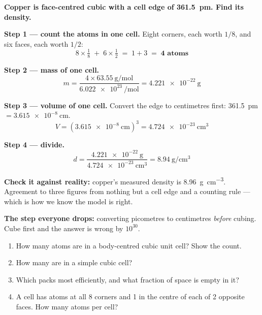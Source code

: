 \documentclass{apchem-worksheet}
\begin{document}
\begin{workedexample}
\textbf{Copper is face-centred cubic with a cell edge of
\SI{361.5}{\pico\metre}. Find its density.}

\textbf{Step 1 --- count the atoms in one cell.} Eight corners, each
worth $1/8$, and six faces, each worth $1/2$:
\[ 8 \times \tfrac{1}{8} \;+\; 6 \times \tfrac{1}{2}
   \;=\; 1 + 3 \;=\; \mathbf{4 \text{ atoms}} \]

\textbf{Step 2 --- mass of one cell.}
\[ m = \frac{4 \times \SI{63.55}{\gram\per\mole}}
            {\SI{6.022e23}{\per\mole}}
     = \SI{4.221e-22}{\gram} \]

\textbf{Step 3 --- volume of one cell.} Convert the edge to centimetres
first: \SI{361.5}{\pico\metre} $= \SI{3.615e-8}{\centi\metre}$.
\[ V = (\SI{3.615e-8}{\centi\metre})^{3}
     = \SI{4.724e-23}{\centi\metre\cubed} \]

\textbf{Step 4 --- divide.}
\[ d = \frac{\SI{4.221e-22}{\gram}}{\SI{4.724e-23}{\centi\metre\cubed}}
     = \SI{8.94}{\gram\per\centi\metre\cubed} \]

\textbf{Check it against reality:} copper's measured density is
\SI{8.96}{\gram\per\centi\metre\cubed}. Agreement to three figures from
nothing but a cell edge and a counting rule --- which is how we know the
model is right.

\textbf{The step everyone drops:} converting picometres to centimetres
\emph{before} cubing. Cube first and the answer is wrong by $10^{30}$.
\end{workedexample}

\begin{yourturn}
\begin{enumerate}[leftmargin=*,itemsep=0.5em]
  \item How many atoms are in a body-centred cubic unit cell? Show the
        count. \workspace[1.6cm]
  \item How many are in a simple cubic cell? \workspace[1.4cm]
  \item Which packs most efficiently, and what fraction of space is
        empty in it? \workspace[1.6cm]
  \item A cell has atoms at all 8 corners and 1 in the centre of each of
        2 opposite faces. How many atoms per cell?
        \workspace[1.6cm]
\end{enumerate}
\end{yourturn}
\end{document}
